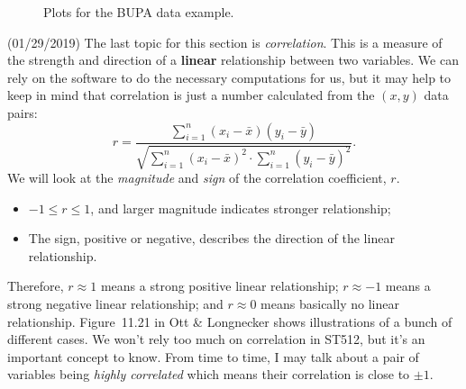 \documentclass[a4paper, 12pt]{article}
\theoremstyle{plain}
\theoremstyle{definition}
\theoremstyle{remark}
\begin{document}
\begin{figure}
\begin{center}
\end{center}
\caption{Plots for the BUPA data example.}
\label{fig:bupa}
\end{figure}


(01/29/2019) The last topic for this section is {\em correlation}.  This is a measure of the strength and direction of a {\bf linear} relationship between two variables.  We can rely on the software to do the necessary computations for us, but it may help to keep in mind that correlation is just a number calculated from the $(x,y)$ data pairs:
\[ r = \frac{\sum_{i=1}^n (x_i - \bar x)(y_i - \bar y)}{\sqrt{ \sum_{i=1}^n (x_i - \bar x)^2 \cdot \sum_{i=1}^n (y_i - \bar y)^2}}. \]
We will look at the {\em magnitude} and {\em sign} of the correlation coefficient, $r$.  
\begin{itemize}
\item $-1 \leq r \leq 1$, and larger magnitude indicates stronger relationship; 
\vspace{-2mm}
\item The sign, positive or negative, describes the direction of the linear relationship.
\end{itemize}
Therefore, $r \approx 1$ means a strong positive linear relationship; $r \approx -1$ means a strong negative linear relationship; and $r \approx 0$ means basically no linear relationship.  Figure~11.21 in Ott \& Longnecker shows illustrations of a bunch of different cases.  We won't rely too much on correlation in ST512, but it's an important concept to know.  From time to time, I may talk about a pair of variables being {\em highly correlated} which means their correlation is close to $\pm 1$.  
\end{document}
